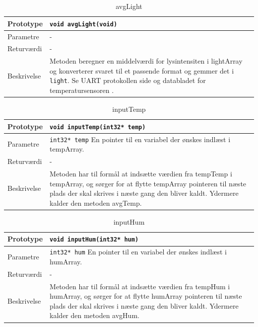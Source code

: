 
\begin{table}[h]
\begin{tabularx}{\textwidth}{| L{2.5 cm} | Z |} \hline
Prototype & \texttt{void avgLight(void)} \\\hline
Parametre & - \\\hline
Returværdi & - \\\hline
Beskrivelse & Metoden beregner en middelværdi for lysintensiten i lightArray og konverterer svaret til et passende format og gemmer det i \texttt{light}. Se UART protokollen side \pageref{sec:UART_protokol} og databladet for temperatursensoren \cite{lib:LightSens}.  \\ \hline
\end{tabularx}
\caption{avgLight}
\label{table:avgLight}
\end{table}


\begin{table}[h]
\begin{tabularx}{\textwidth}{| L{2.5 cm} | Z |} \hline
Prototype & \texttt{void inputTemp(int32* temp)} \\\hline
Parametre & \texttt{int32* temp} \newline
En pointer til en variabel der ønskes indlæst i tempArray. \\\hline
Returværdi & - \\\hline
Beskrivelse & Metoden har til formål at indsætte værdien fra tempTemp i tempArray, og sørger for at flytte tempArray pointeren til næste plads der skal skrives i næste gang den bliver kaldt. Ydermere kalder den metoden avgTemp.  \\\hline
\end{tabularx}
\caption{inputTemp}
\label{table:inputTemp}
\end{table}


\begin{table}[h]
\begin{tabularx}{\textwidth}{| L{2.5 cm} | Z |} \hline
Prototype & \texttt{void inputHum(int32* hum)} \\\hline
Parametre & \texttt{int32* hum} \newline
En pointer til en variabel der ønskes indlæst i humArray. \\\hline
Returværdi & - \\\hline
Beskrivelse & Metoden har til formål at indsætte værdien fra tempHum i humArray, og sørger for at flytte humArray pointeren til næste plads der skal skrives i næste gang den bliver kaldt. Ydermere kalder den metoden avgHum.  \\\hline
\end{tabularx}
\caption{inputHum}
\label{table:inputHum}
\end{table}


